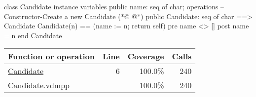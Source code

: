 \begin{vdmpp}
class Candidate
instance variables
 public name: seq of char;
operations
--Constructor-Create a new Candidate
(*@
\label{Candidate:6}
@*)
 public Candidate: seq of char ==> Candidate
 Candidate(n) == (name := n; return self)
 pre name <> []
 post name = n
end Candidate
\end{vdmpp}
\bigskip
\begin{longtable}{|l|r|r|r|}
\hline
Function or operation & Line & Coverage & Calls \\
\hline
\hline
\hyperref[Candidate:6]{Candidate} & 6&100.0\% & 240 \\
\hline
\hline
Candidate.vdmpp & & 100.0\% & 240 \\
\hline
\end{longtable}

